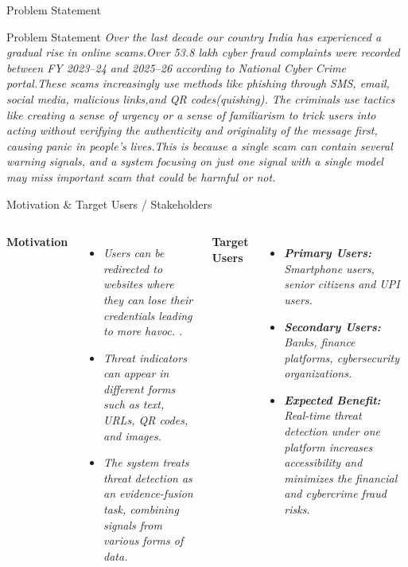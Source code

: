 \documentclass[aspectratio=169,11pt]{beamer}
\newcommand{\placeholder}[1]{\textit{\color{GEUGrey}#1}}
\begin{document}
\begin{frame}{Problem Statement }
\begin{block}{Problem Statement}
\placeholder{Over the last decade our country India has experienced a gradual rise in online scams.Over 53.8 lakh cyber fraud complaints were recorded between FY 2023–24 and 2025–26 according to National Cyber Crime portal.These scams increasingly use methods like phishing through SMS, email, social media, malicious links,and QR codes(quishing). The criminals use tactics like creating a sense of urgency or a sense of familiarism to trick users into acting without verifying the authenticity and originality of the message first, causing panic in people's lives.This is because a single scam can contain several warning signals, and a system focusing on just one signal with a single model may miss important scam that could be harmful or not.}
\end{block}


\end{frame}
\begin{frame}{Motivation \& Target Users / Stakeholders}
\small
\begin{columns}[T,totalwidth=\textwidth]


\textbf{\color{GEUBlue}Motivation}

\begin{itemize}\itemsep2pt
    \item \placeholder {Users can be redirected to websites where they can lose their credentials  leading to more havoc.
.}
    \item \placeholder {Threat indicators can appear in different forms such as text, URLs, QR codes, and images.}
    \item \placeholder {The system treats threat detection as an evidence-fusion task, combining signals from various forms of data.}
\end{itemize}

\vspace{5mm}



\textbf{\color{GEUBlue}Target Users }

\begin{itemize}\itemsep4pt \parskip0pt
    \item \placeholder { \textbf{Primary Users:} Smartphone users, senior citizens and UPI users.}
    \item  \placeholder {\textbf{Secondary Users:} Banks, finance platforms, cybersecurity organizations.}
    \item  \placeholder { \textbf{Expected Benefit:} Real-time threat detection under one platform increases accessibility and minimizes the financial and cybercrime fraud risks.}
\end{itemize}

\end{columns}

\end{frame}
\end{document}
